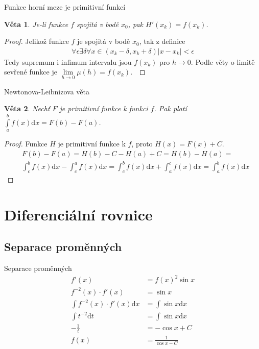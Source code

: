 \documentclass{beamer}
\newtheorem{thm}{Věta}
\theoremstyle{definition}
\theoremstyle{example}
\def\d{\mathrm{d}}
\begin{document}
\begin{frame}{Funkce horní meze je primitivní funkcí}
	\begin{thm}
		Je-li funkce $f$ spojitá v bodě $x_0$, pak $H'(x_k) = f(x_k)$.
	\end{thm}
	\begin{proof}
		Jelikož funkce $f$ je spojitá v bodě $x_0$, tak z definice
		\begin{align*}
			\forall \epsilon \exists \delta \forall x \in (x_k - \delta, x_k + \delta) |x - x_k| < \epsilon
		\end{align*}
		Tedy supremum i infimum intervalu jsou $f(x_k)$ pro $h \rightarrow 0$. Podle věty o limitě sevřené funkce je $\lim\limits_{h \rightarrow 0} \mu(h) = f(x_k)$.~\cite{zaklady2}
	\end{proof}
\end{frame}

\begin{frame}{Newtonova-Leibnizova věta}
	\begin{thm}
		Nechť $F$ je primitivní funkce k funkci $f$. Pak platí $\int\limits_a^b f(x) \d x = F(b) - F(a)$. 
	\end{thm}
	\begin{proof}
		Funkce $H$ je primitivní funkce k $f$, proto $H(x) = F(x) + C$.
		\begin{align*}
			&F(b) - F(a) = H(b) - C - H(a) + C = H(b) - H(a) =\\
			&\int_c^b f(x) \d x - \int_c^a f(x) \d x = \int_c^b f(x) \d x + \int_a^c f(x) \d x = \int_a^b f(x) \d x
		\end{align*}
	\end{proof}
\end{frame}

\section{Diferenciální rovnice}
\subsection{Separace proměnných}
\begin{frame}{Separace proměnných}
	\begin{align*}
		f'(x) &= f(x)^2 \sin x\\
		f^{-2}(x) \cdot f'(x) &= \sin x\\
		\int f^{-2}(x) \cdot f'(x) \d x &= \int \sin x \d x\\
		\int t^{-2} \d t &= \int \sin x \d x\\
		-\frac{1}{t} &= -\cos x + C\\
		f(x) &= \frac{1}{\cos x - C}\\ 
	\end{align*}
\end{frame}
\end{document}
